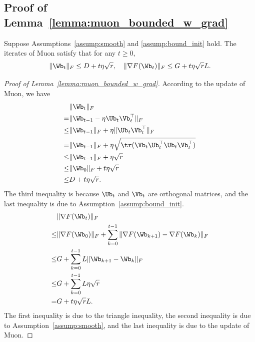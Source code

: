 \documentclass[11pt, letterpaper]{article}
\begin{document}
\subsection{Proof of Lemma~\ref{lemma:muon_bounded_w_grad}}
\begin{lemma}\label{lemma:muon_bounded_w_grad}
    Suppose Assumptions~\ref{assump:smooth} and \ref{assump:bound_init} hold. The iterates of Muon satisfy that for any $t\ge 0$,
    \begin{align*}
        \|\Wb_t\|_F \le D+t\eta\sqrt{r},\quad \|\nabla F(\Wb_t)\|_F \le G + t\eta\sqrt{r}L.
    \end{align*}
\end{lemma}
\begin{proof}[Proof of Lemma~\ref{lemma:muon_bounded_w_grad}]
    According to the update of Muon, we have
    \begin{align*}
        & \|\Wb_t\|_F \\
        =& \|\Wb_{t-1} - \eta\Ub_t\Vb_t^{\top}\|_F \\
        \le& \|\Wb_{t-1}\|_F + \eta \|\Ub_t\Vb_t^{\top}\|_F \\
        =& \|\Wb_{t-1}\|_F + \eta\sqrt{\tr(\Vb_t\Ub_t^{\top}\Ub_t\Vb_t^{\top})} \\
        \le& \|\Wb_{t-1}\|_F + \eta\sqrt{r} \\
        \le& \|\Wb_0\|_F + t\eta\sqrt{r} \\
        \le& D + t\eta\sqrt{r}.    
    \end{align*}
    The third inequality is because $\Ub_t$ and $\Vb_t$ are orthogonal matrices, and the last inequality is due to Assumption~\ref{assump:bound_init}.
    \begin{align*}
        & \|\nabla F(\Wb_t)\|_F \\
        \le& \|\nabla F(\Wb_0)\|_F + \sum_{k=0}^{t-1} \|\nabla F(\Wb_{k+1}) - \nabla F(\Wb_k)\|_F \\
        \le& G + \sum_{k=0}^{t-1} L\|\Wb_{k+1} - \Wb_k\|_F \\
        \le& G + \sum_{k=0}^{t-1} L\eta\sqrt{r} \\
        =& G + t\eta\sqrt{r}L.
    \end{align*}
    The first inequality is due to the triangle inequality, the second inequality is due to Assumption~\ref{assump:smooth}, and the last inequality is due to the update of Muon.
\end{proof}
\end{document}
